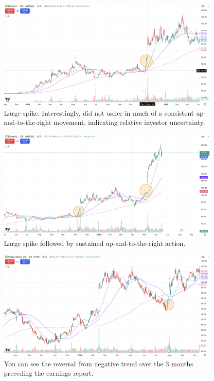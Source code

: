 \documentclass[11pt]{article}
\begin{document}
    \begin{figure}[H]
        \centering
        \includegraphics[width=1.0\linewidth]{images/DAVE1.png}
        \caption{Large spike. Interestingly, did not usher in much of a consistent up-and-to-the-right movement, indicating relative investor uncertainty.}
        \label{fig:DAVE1}
    \end{figure}

    \begin{figure}[H]
        \centering
        \includegraphics[width=1.0\linewidth]{images/DAVE2.png}
        \caption{Large spike followed by sustained up-and-to-the-right action.}
        \label{fig:DAVE2}
    \end{figure}

    \begin{figure}[H]
        \centering
        \includegraphics[width=1.0\linewidth]{images/SHAK1.png}
        \caption{You can see the reversal from negative trend over the 3 months preceding the earnings report.}
        \label{fig:SHAK1}
    \end{figure}
\end{document}
